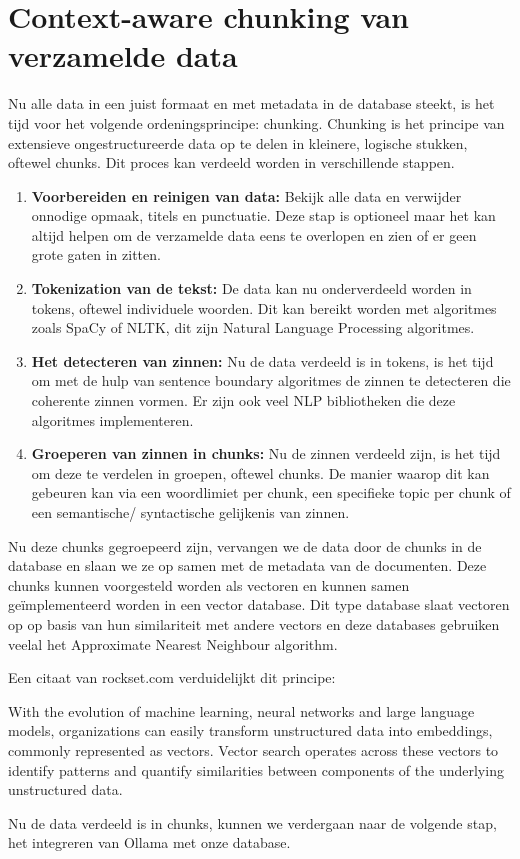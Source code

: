 \chapter{Context-aware chunking van verzamelde data}
Nu alle data in een juist formaat en met metadata in de database steekt, is het tijd voor het volgende ordeningsprincipe: chunking.
Chunking is het principe van extensieve ongestructureerde data op te delen in kleinere, logische stukken, oftewel chunks.
Dit proces kan verdeeld worden in verschillende stappen.

\begin{enumerate}
	\item \textbf{Voorbereiden en reinigen van data:} Bekijk alle data en verwijder onnodige opmaak, titels en punctuatie. Deze stap is optioneel maar het
	      kan altijd helpen om de verzamelde data eens te overlopen en zien of er geen grote gaten in zitten.
	\item \textbf{Tokenization van de tekst:} De data kan nu onderverdeeld worden in tokens, oftewel individuele woorden.
	      Dit kan bereikt worden met algoritmes zoals SpaCy of NLTK,
	      dit zijn Natural Language Processing algoritmes.
	\item \textbf{Het detecteren van zinnen:} Nu de data verdeeld is in tokens, is het tijd om met de hulp van sentence boundary algoritmes de zinnen te
	      detecteren die coherente zinnen vormen. Er zijn ook veel NLP bibliotheken die deze algoritmes implementeren.
	\item \textbf{Groeperen van zinnen in chunks:} Nu de zinnen verdeeld zijn, is het tijd om deze te verdelen in groepen, oftewel chunks.
	      De manier waarop dit kan gebeuren kan via een woordlimiet per chunk, een specifieke topic per chunk of een semantische/ syntactische gelijkenis van zinnen.
\end{enumerate}

Nu deze chunks gegroepeerd zijn, vervangen we de data door de chunks in de database en slaan we ze op samen met de metadata van de documenten.
Deze chunks kunnen voorgesteld worden als vectoren en kunnen samen geïmplementeerd worden in een vector database.
Dit type database slaat vectoren op op basis van hun similariteit met andere vectors en deze databases gebruiken veelal het Approximate Nearest Neighbour algorithm.

Een citaat van rockset.com verduidelijkt dit principe:

\begin{displayquote}
	With the evolution of machine learning, neural networks and large language models, organizations can easily transform unstructured data into embeddings, commonly represented as vectors.
	Vector search operates across these vectors to identify patterns and quantify similarities between components of the underlying unstructured data. 
	\autocite{Rockset}
\end{displayquote}

Nu de data verdeeld is in chunks, kunnen we verdergaan naar de volgende stap, het integreren van Ollama met onze database.
